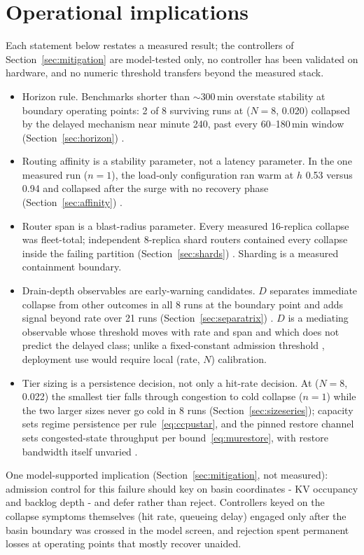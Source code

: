 \section{Operational implications}
\label{sec:implications}

Each statement below restates a measured result; the controllers of
Section~\ref{sec:mitigation} are model-tested only, no controller has been validated on
hardware, and no numeric threshold transfers beyond the measured
stack.

\begin{itemize}
\item Horizon rule. Benchmarks shorter than $\sim$300\,min overstate stability
  at boundary operating points: 2 of 8 surviving runs at
  ($N{=}8$, 0.020) collapsed by the delayed mechanism near minute 240,
  past every 60--180\,min window (Section~\ref{sec:horizon}) .
\item Routing affinity is a stability parameter, not a latency
  parameter. In the one measured run ($n=1$), the load-only
  configuration ran warm at $h$ 0.53 versus 0.94 and collapsed after
  the surge with no recovery phase (Section~\ref{sec:affinity}) .
\item Router span is a blast-radius parameter. Every measured 16-replica
  collapse was fleet-total; independent 8-replica shard routers
  contained every collapse inside the failing partition
  (Section~\ref{sec:shards}) . Sharding is a measured containment boundary.
\item Drain-depth observables are early-warning candidates. $D$ separates
  immediate collapse from other outcomes in all 8 runs at the
  boundary point and adds signal beyond rate over 21 runs
  (Section~\ref{sec:separatrix}) . $D$ is a mediating observable whose threshold
  moves with rate and span and which does not predict the delayed
  class; unlike a fixed-constant admission threshold
  \cite{chen2026concur}, deployment use would require local (rate, $N$)
  calibration.
\item Tier sizing is a persistence decision, not only a hit-rate
  decision. At ($N{=}8$, 0.022) the smallest tier falls through
  congestion to cold collapse ($n=1$) while the two larger sizes never
  go cold in 8 runs (Section~\ref{sec:sizeseries}); capacity sets regime persistence
  per rule~\eqref{eq:ccpustar}, and the pinned restore channel sets congested-state
  throughput per bound~\eqref{eq:murestore}, with restore bandwidth itself unvaried
  .
\end{itemize}

One model-supported implication (Section~\ref{sec:mitigation}, not measured): admission
control for this failure should key on basin coordinates - KV
occupancy and backlog depth - and defer rather than reject.
Controllers keyed on the collapse symptoms themselves (hit rate,
queueing delay) engaged only after the basin boundary was crossed in
the model screen, and rejection spent permanent losses at operating
points that mostly recover unaided.
